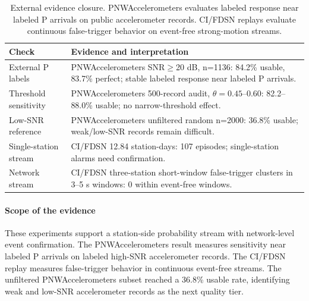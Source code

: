 \begin{table}[H]
\centering
\caption{External evidence closure. PNWAccelerometers evaluates labeled response near labeled P arrivals on public accelerometer records. CI/FDSN replays evaluate continuous false-trigger behavior on event-free strong-motion streams.}
\label{tab:external_evidence_closure}
{\tgrsdensetablesetup
\begin{tabular}{@{}p{}p{}@{}}
\toprule
Check & Evidence and interpretation \\
\midrule
External P labels & PNWAccelerometers SNR$\ge$20 dB, n=1136: 84.2\% usable, 83.7\% perfect; stable labeled response near labeled P arrivals. \\
Threshold sensitivity & PNWAccelerometers 500-record audit, $\theta=0.45$--0.60: 82.2--88.0\% usable; no narrow-threshold effect. \\
Low-SNR reference & PNWAccelerometers unfiltered random n=2000: 36.8\% usable; weak/low-SNR records remain difficult. \\
Single-station stream & CI/FDSN 12.84 station-days: 107 episodes; single-station alarms need confirmation. \\
Network stream & CI/FDSN three-station short-window false-trigger clusters in 3--5 s windows: 0 within event-free windows. \\
\bottomrule
\end{tabular}}
\end{table}

\paragraph{Scope of the evidence}
These experiments support a station-side probability stream with network-level event confirmation. The PNWAccelerometers result measures sensitivity near labeled P arrivals on labeled high-SNR accelerometer records. The CI/FDSN replay measures false-trigger behavior in continuous event-free streams. The unfiltered PNWAccelerometers subset reached a 36.8\% usable rate, identifying weak and low-SNR accelerometer records as the next quality tier.
